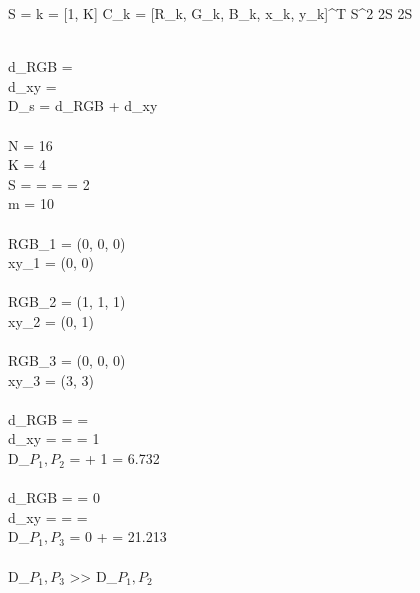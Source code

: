 S = 
k = [1, K]
C_k = [R_k, G_k, B_k, x_k, y_k]^T
S^2
2S \times 2S

\\
d_{RGB} =  \\
d_{xy} =  \\
D_s = d_{RGB} + d_{xy}\\

\\
N = 16 \\
K = 4 \\
S =  =  =  = 2 \\
m = 10 \\

\\
RGB_1 = (0, 0, 0) \\
xy_1 = (0, 0) \\ \\
RGB_2 = (1, 1, 1) \\
xy_2 = (0, 1) \\ \\
RGB_3 = (0, 0, 0) \\
xy_3 = (3, 3) \\

\\
d_{RGB} =  =  \\
d_{xy} =  =  = 1 \\
D_{\(P_1, P_2\)} =  + 1 = 6.732 \\
\\
d_{RGB} =  = 0 \\
d_{xy} =  =  =  \\
D_{\(P_1, P_3\)} = 0 +  = 21.213 \\
\\
D_{\(P_1, P_3\)} >> D_{\(P_1, P_2\)} 
